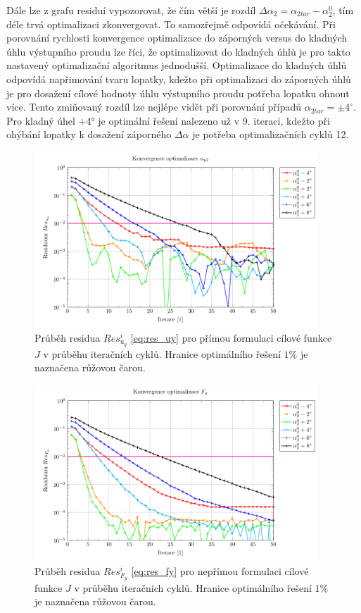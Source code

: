 Dále lze z grafu residuí vypozorovat, že čím větší je rozdíl $ \Delta \alpha_{2} = \alpha_{2tar} - \alpha_{2}^{0}$, tím déle trvá optimalizaci zkonvergovat. To samozřejmě odpovídá očekávání. Při porovnání rychlosti konvergence optimalizace do záporných versus do kladných úhlu výstupního proudu lze říci, že optimalizovat do kladných úhlů je pro takto nastavený optimalizační algoritmus jednodušší. Optimalizace do kladných úhlů odpovídá napřimování tvaru lopatky, kdežto při optimalizaci do záporných úhlů je pro dosažení cílové hodnoty úhlu výstupního proudu potřeba lopatku ohnout více. Tento zmiňovaný rozdíl lze nejlépe vidět při porovnání případů $ \alpha_{2tar}=\pm 4^{\circ} $. Pro kladný úhel +4° je optimální řešení nalezeno už v 9. iteraci, kdežto při ohýbání lopatky k dosažení záporného $ \Delta\alpha $ je potřeba optimalizačních cyklů 12.

\begin{figure}[H]
	\includegraphics[width=0.95\textwidth]{img/Uy.pdf}
	\caption[Průběh residua $ Res_{u_y}^i $]{Průběh residua $ Res_{u_y}^i $ \ref{eq:res_uy} pro přímou formulaci cílové funkce $ J $ v průběhu iteračních cyklů. Hranice optimálního řešení $ 1\% $ je naznačena růžovou čarou.}
	\label{fig:ghs1_Uy}
\end{figure}

\begin{figure}[H]
	\includegraphics[width=0.95\textwidth]{img/Fy.pdf}
	\caption[Průběh residua $ Res_{F_y}^i $]{Průběh residua $ Res_{F_y}^i $ \ref{eq:res_fy} pro nepřímou formulaci cílové funkce $ J $ v průběhu iteračních cyklů. Hranice optimálního řešení $ 1\% $ je naznačena růžovou čarou.}
	\label{fig:ghs1_Fy}
\end{figure}

